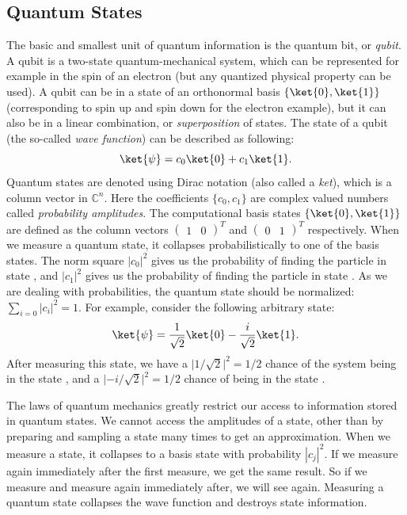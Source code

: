 \documentclass[a4paper,10pt]{article}
\begin{document}
\subsection{Quantum States}
The basic and smallest unit of quantum information is the quantum bit, or \emph{qubit}.
A qubit is a two-state quantum-mechanical system, which can be represented for example in the spin of an electron (but any quantized physical property can be used).
A qubit can be in a state of an orthonormal basis $\{\ket{0}, \ket{1}\}$ (corresponding to spin up and spin down for the electron example), but it can also be in a linear combination, or \emph{superposition} of states.
The state of a qubit (the so-called \emph{wave function}) can be described as following:
\begin{equation}
\ket{\psi} = c_0\ket{0} + c_1\ket{1}.
\end{equation}
Quantum states are denoted using Dirac notation \ket{\,\cdotp\,} (also called a \emph{ket}), which is a column vector in $\mathbb{C}^n$.
Here the coefficients $\{c_0, c_1\}$ are complex valued numbers called \emph{probability amplitudes}.
The computational basis states $\{\ket{0}, \ket{1}\}$ are defined as the column vectors $(\begin{matrix}1 & 0\end{matrix})^T$ and $(\begin{matrix}0 & 1\end{matrix})^T$ respectively.
When we measure a quantum state, it collapses probabilistically to one of the basis states.
The norm square $|c_0|^2$ gives us the probability of finding the particle in state , and $|c_1|^2$ gives us the probability of finding the particle in state .
As we are dealing with probabilities, the quantum state should be normalized: $\sum_{i=0}|c_i|^2 = 1$.
For example, consider the following arbitrary state:
\begin{equation} \label{eq:arbitary_state_example}
\ket{\psi} = \dfrac{1}{\sqrt2}\ket{0} - \dfrac{i}{\sqrt2}\ket{1}.
\end{equation}
After measuring this state, we have a $\lvert1/\sqrt2\rvert^2 = 1/2$ chance of the system being in the state , and a $\lvert{-}i/\sqrt2\rvert^2 = 1/2$ chance of being in the state .

The laws of quantum mechanics greatly restrict our access to information stored in quantum states.
We cannot access the amplitudes of a state, other than by preparing and sampling a state many times to get an approximation. 
When we measure a state, it collapses to a basis state  with probability $|c_j|^2$.
If we measure again immediately after the first measure, we get the same result.
So if we measure  and measure again immediately after, we will see  again.
Measuring a quantum state collapses the wave function and destroys state information.
\end{document}
